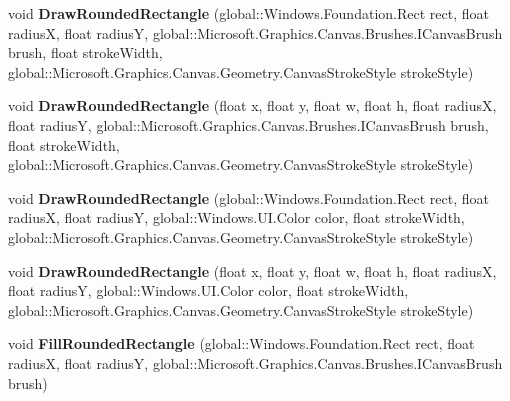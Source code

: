 \begin{DoxyCompactItemize}
void {\bfseries Draw\+Rounded\+Rectangle} (global\+::\+Windows.\+Foundation.\+Rect rect, float radiusX, float radiusY, global\+::\+Microsoft.\+Graphics.\+Canvas.\+Brushes.\+I\+Canvas\+Brush brush, float stroke\+Width, global\+::\+Microsoft.\+Graphics.\+Canvas.\+Geometry.\+Canvas\+Stroke\+Style stroke\+Style)
\item 
\mbox{\label{interface_microsoft_1_1_graphics_1_1_canvas_1_1_i_canvas_drawing_session_adff21a020b9f84586b717e5aade6a26f}} 
void {\bfseries Draw\+Rounded\+Rectangle} (float x, float y, float w, float h, float radiusX, float radiusY, global\+::\+Microsoft.\+Graphics.\+Canvas.\+Brushes.\+I\+Canvas\+Brush brush, float stroke\+Width, global\+::\+Microsoft.\+Graphics.\+Canvas.\+Geometry.\+Canvas\+Stroke\+Style stroke\+Style)
\item 
\mbox{\label{interface_microsoft_1_1_graphics_1_1_canvas_1_1_i_canvas_drawing_session_ae688a62c6075ccb17c35d731ca230243}} 
void {\bfseries Draw\+Rounded\+Rectangle} (global\+::\+Windows.\+Foundation.\+Rect rect, float radiusX, float radiusY, global\+::\+Windows.\+U\+I.\+Color color, float stroke\+Width, global\+::\+Microsoft.\+Graphics.\+Canvas.\+Geometry.\+Canvas\+Stroke\+Style stroke\+Style)
\item 
\mbox{\label{interface_microsoft_1_1_graphics_1_1_canvas_1_1_i_canvas_drawing_session_ae286fa627aa637fa115f69d968e0b91c}} 
void {\bfseries Draw\+Rounded\+Rectangle} (float x, float y, float w, float h, float radiusX, float radiusY, global\+::\+Windows.\+U\+I.\+Color color, float stroke\+Width, global\+::\+Microsoft.\+Graphics.\+Canvas.\+Geometry.\+Canvas\+Stroke\+Style stroke\+Style)
\item 
\mbox{\label{interface_microsoft_1_1_graphics_1_1_canvas_1_1_i_canvas_drawing_session_a7af8aba47096bd242ea560fec93ab1ef}} 
void {\bfseries Fill\+Rounded\+Rectangle} (global\+::\+Windows.\+Foundation.\+Rect rect, float radiusX, float radiusY, global\+::\+Microsoft.\+Graphics.\+Canvas.\+Brushes.\+I\+Canvas\+Brush brush)
\item 
\mbox{\label{interface_microsoft_1_1_graphics_1_1_canvas_1_1_i_canvas_drawing_session_a5c55fb3be927ecd824759f402bf841eb}} 

\end{DoxyCompactItemize}
